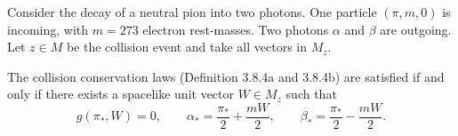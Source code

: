 Consider the decay of a neutral pion into two photons. One particle $(\pi, m, 0)$ is incoming, with $m = 273$ electron rest-masses. Two photons $\alpha$ and $\beta$ are outgoing. Let $z \in M$ be the collision event and take all vectors in $M_z$.

The collision conservation laws (Definition 3.8.4a and 3.8.4b) are satisfied if and only if there exists a spacelike unit vector $W \in M_z$ such that
$$g(\pi_*, W) = 0, \qquad \alpha_* = \frac{\pi_*}{2} + \frac{mW}{2}, \qquad \beta_* = \frac{\pi_*}{2} - \frac{mW}{2}.$$
